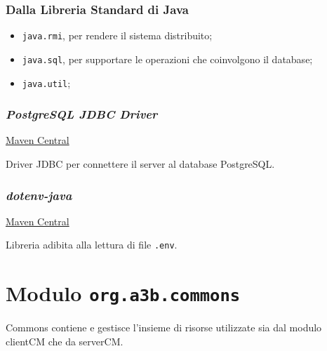 \subsection{Dalla Libreria Standard di Java}

\begin{itemize}
	\item \texttt{java.rmi}, per rendere il sistema distribuito;
	\item \texttt{java.sql}, per supportare le operazioni che coinvolgono il database;
	\item \texttt{java.util};
\end{itemize}


\subsection{\textsl{PostgreSQL JDBC Driver}}

\href{https://mvnrepository.com/artifact/org.postgresql/postgresql/42.7.3}{Maven Central}

Driver JDBC per connettere il server al database PostgreSQL.

\subsection{\textsl{dotenv-java}}

\href{https://mvnrepository.com/artifact/io.github.cdimascio/dotenv-java/3.0.0}{Maven Central}
	
Libreria adibita alla lettura di file \texttt{.env}.

\chapter{Modulo \texttt{org.a3b.commons}}
\label{ch:commons}
Commons contiene e gestisce l'insieme di risorse utilizzate sia dal modulo clientCM che da serverCM.

